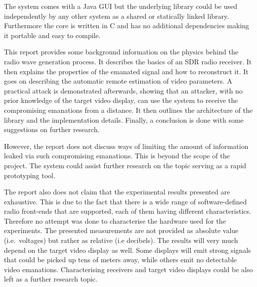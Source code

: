 \documentclass[a4paper,12pt,twoside,openright]{report}
\begin{document}
The system comes with a Java GUI but the underlying library could be used independently by any other system as a shared or statically linked library. Furthermore the core is written in C and has no additional dependencies making it portable and easy to compile.

This report provides some background information on the physics behind the radio wave generation process. It describes the basics of an SDR radio receiver. It then explains the properties of the emanated signal and how to reconstruct it. It goes on describing the automatic remote estimation of video parameters. A practical attack is demonstrated afterwards, showing that an attacker, with no prior knowledge of the target video display, can use the system to receive the compromising emanations from a distance. It then outlines the architecture of the library and the implementation details. Finally, a conclusion is done with some suggestions on further research.

However, the report does not discuss ways of limiting the amount of information leaked via such compromising emanations. This is beyond the scope of the project. The system could assist further research on the topic serving as a rapid prototyping tool.

The report also does not claim that the experimental results presented are exhaustive. This is due to the fact that there is a wide range of software-defined radio front-ends that are supported, each of them having different characteristics. Therefore no attempt was done to characterise the hardware used for the experiments. The presented measurements are not provided as absolute value (i.e.\  voltages) but rather as relative (i.e decibels). The results will very much depend on the target video display as well. Some displays will emit strong signals that could be picked up tens of meters away, while others emit no detectable video emanations. Characterising receivers and target video displays could be also left as a further research topic.
\end{document}
